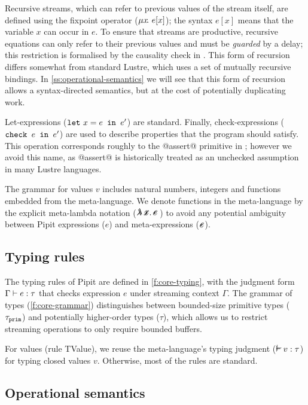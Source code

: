 \documentclass[sigplan,screen]{acmart}
\begin{document}
Recursive streams, which can refer to previous values of the stream itself, are defined using the fixpoint operator ($\mu{} x \!.~e[x]$); the syntax $e[x]$ means that the variable $x$ can occur in $e$.
To ensure that streams are productive, recursive equations can only refer to their previous values and must be \emph{guarded} by a delay; this restriction is formalised by the causality check in \REF{}.
This form of recursion differs somewhat from standard Lustre, which uses a set of mutually recursive bindings.
In \autoref{ss:operational-semantics} we will see that this form of recursion allows a syntax-directed semantics, but at the cost of potentially duplicating work.

Let-expressions ($\texttt{let}~x = e \texttt{~in~} e'$) are standard.
Finally, check-expressions ($\texttt{check~} e \texttt{~in~} e'$) are used to describe properties that the program should satisfy.
This operation corresponds roughly to the @assert@ primitive in \fstar{}; however we avoid this name, as @assert@ is historically treated as an unchecked assumption in many Lustre languages.

The grammar for values $v$ includes natural numbers, integers and functions embedded from the \fstar{} meta-language.
We denote functions in the meta-language by the explicit meta-lambda notation ($\mlamX{}$) to avoid any potential ambiguity between Pipit expressions ($e$) and meta-expressions ($\metafy{e}$).

\subsection{Typing rules}
\label{ss:typing-rules}

The typing rules of Pipit are defined in \autoref{f:core-typing}, with the judgment form $\Gamma \vdash e : \tau$ that checks expression $e$ under streaming context $\Gamma$.
The grammar of types (\autoref{f:core-grammar}) distinguishes between bounded-size primitive types ($\tau_{\texttt{prim}}$) and potentially higher-order types ($\tau$), which allows us to restrict streaming operations to only require bounded buffers.

For values (rule TValue), we reuse the \fstar{} meta-language's typing judgment ($\mtyping{}{v}{\tau}$) for typing closed values $v$.
Otherwise, most of the rules are standard.

\subsection{Operational semantics}
\label{ss:operational-semantics}
\end{document}
